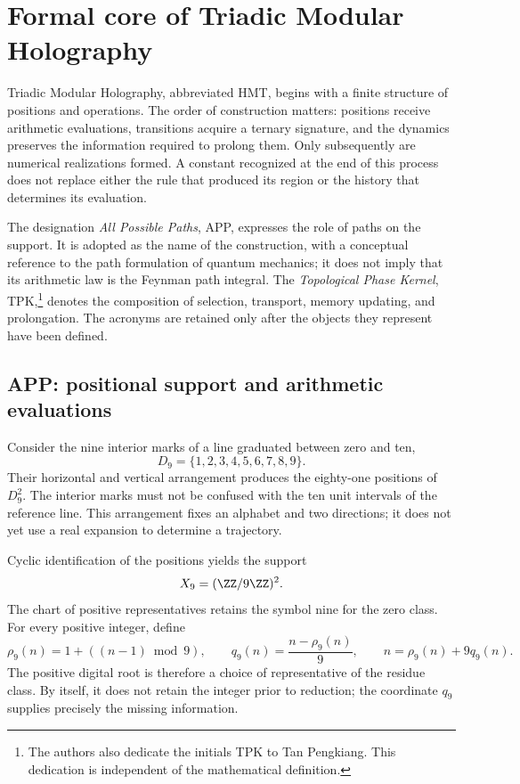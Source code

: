 \section{Formal core of Triadic Modular Holography}
\label{sec:nucleo}

Triadic Modular Holography, abbreviated HMT, begins with a finite structure of positions and operations. The order of construction matters: positions receive arithmetic evaluations, transitions acquire a ternary signature, and the dynamics preserves the information required to prolong them. Only subsequently are numerical realizations formed. A constant recognized at the end of this process does not replace either the rule that produced its region or the history that determines its evaluation.

The designation \emph{All Possible Paths}, APP, expresses the role of paths on the support. It is adopted as the name of the construction, with a conceptual reference to the path formulation of quantum mechanics; it does not imply that its arithmetic law is the Feynman path integral. The \emph{Topological Phase Kernel}, TPK,\footnote{The authors also dedicate the initials TPK to Tan Pengkiang. This dedication is independent of the mathematical definition.} denotes the composition of selection, transport, memory updating, and prolongation. The acronyms are retained only after the objects they represent have been defined.

\subsection{APP: positional support and arithmetic evaluations}

Consider the nine interior marks of a line graduated between zero and ten,
\[
 D_9=\{1,2,3,4,5,6,7,8,9\}.
\]
Their horizontal and vertical arrangement produces the eighty-one positions of \(D_9^2\). The interior marks must not be confused with the ten unit intervals of the reference line. This arrangement fixes an alphabet and two directions; it does not yet use a real expansion to determine a trajectory.

Cyclic identification of the positions yields the support
\[
 X_9=(\ZZ/9\ZZ)^2.
\]
The chart of positive representatives retains the symbol nine for the zero class. For every positive integer, define
\begin{equation}
 \rho_9(n)=1+((n-1)\bmod9),\qquad
 q_9(n)=\frac{n-\rho_9(n)}9,
 \qquad n=\rho_9(n)+9q_9(n).
 \label{eq:residuo-cociente}
\end{equation}
The positive digital root is therefore a choice of representative of the residue class. By itself, it does not retain the integer prior to reduction; the coordinate \(q_9\) supplies precisely the missing information.

